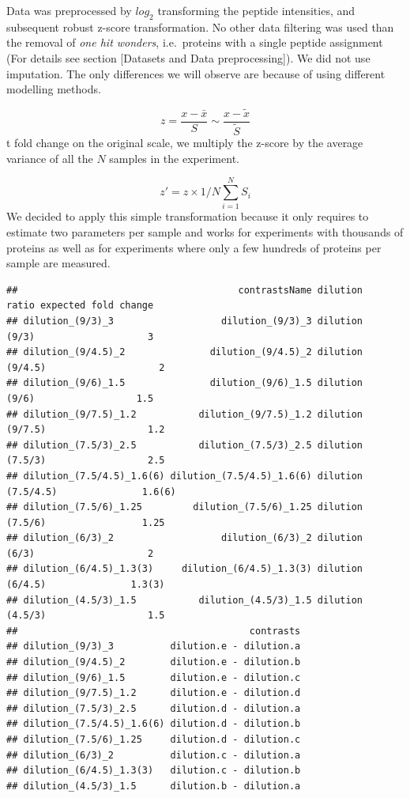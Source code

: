 \documentclass[journal=jacsat,manuscript=article]{achemso}
\begin{document}
Data was preprocessed by \(log_2\) transforming the peptide intensities,
and subsequent robust z-score transformation. No other data filtering
was used than the removal of \emph{one hit wonders}, i.e.~proteins with
a single peptide assignment (For details see section {[}Datasets and
Data preprocessing{]}). We did not use imputation. The only differences
we will observe are because of using different modelling methods.

\[
z = \frac{x - \bar{x}}{S} \sim \frac{x - \tilde{x}}{\tilde{S}}
\] t fold change on the original scale, we multiply the z-score by the
average variance of all the \(N\) samples in the experiment.

\[
z' = z \times 1/N\sum_{i=1}^N S_i
\] We decided to apply this simple transformation because it only
requires to estimate two parameters per sample and works for experiments
with thousands of proteins as well as for experiments where only a few
hundreds of proteins per sample are measured.

\begin{verbatim}
##                                       contrastsName dilution     ratio expected fold change
## dilution_(9/3)_3                   dilution_(9/3)_3 dilution     (9/3)                    3
## dilution_(9/4.5)_2               dilution_(9/4.5)_2 dilution   (9/4.5)                    2
## dilution_(9/6)_1.5               dilution_(9/6)_1.5 dilution     (9/6)                  1.5
## dilution_(9/7.5)_1.2           dilution_(9/7.5)_1.2 dilution   (9/7.5)                  1.2
## dilution_(7.5/3)_2.5           dilution_(7.5/3)_2.5 dilution   (7.5/3)                  2.5
## dilution_(7.5/4.5)_1.6(6) dilution_(7.5/4.5)_1.6(6) dilution (7.5/4.5)               1.6(6)
## dilution_(7.5/6)_1.25         dilution_(7.5/6)_1.25 dilution   (7.5/6)                 1.25
## dilution_(6/3)_2                   dilution_(6/3)_2 dilution     (6/3)                    2
## dilution_(6/4.5)_1.3(3)     dilution_(6/4.5)_1.3(3) dilution   (6/4.5)               1.3(3)
## dilution_(4.5/3)_1.5           dilution_(4.5/3)_1.5 dilution   (4.5/3)                  1.5
##                                         contrasts
## dilution_(9/3)_3          dilution.e - dilution.a
## dilution_(9/4.5)_2        dilution.e - dilution.b
## dilution_(9/6)_1.5        dilution.e - dilution.c
## dilution_(9/7.5)_1.2      dilution.e - dilution.d
## dilution_(7.5/3)_2.5      dilution.d - dilution.a
## dilution_(7.5/4.5)_1.6(6) dilution.d - dilution.b
## dilution_(7.5/6)_1.25     dilution.d - dilution.c
## dilution_(6/3)_2          dilution.c - dilution.a
## dilution_(6/4.5)_1.3(3)   dilution.c - dilution.b
## dilution_(4.5/3)_1.5      dilution.b - dilution.a
\end{verbatim}
\end{document}
